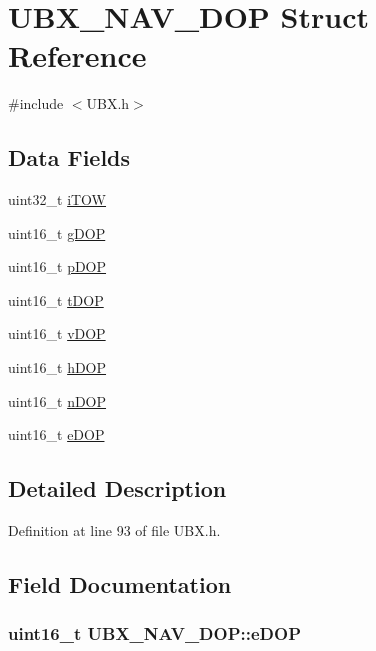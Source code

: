 \hypertarget{struct_u_b_x___n_a_v___d_o_p}{\section{\-U\-B\-X\-\_\-\-N\-A\-V\-\_\-\-D\-O\-P \-Struct \-Reference}
\label{struct_u_b_x___n_a_v___d_o_p}
}


{\ttfamily \#include $<$\-U\-B\-X.\-h$>$}

\subsection*{\-Data \-Fields}
\begin{DoxyCompactItemize}
\item 
uint32\-\_\-t \hyperlink{struct_u_b_x___n_a_v___d_o_p_ae5ea4b23ed8d603c7360a18053975010}{i\-T\-O\-W}
\item 
uint16\-\_\-t \hyperlink{struct_u_b_x___n_a_v___d_o_p_a2b2e6160322047b85f23f1cb527bc6fd}{g\-D\-O\-P}
\item 
uint16\-\_\-t \hyperlink{struct_u_b_x___n_a_v___d_o_p_a1ad5dc519aeceb3054f3a4a0ab8fc5ea}{p\-D\-O\-P}
\item 
uint16\-\_\-t \hyperlink{struct_u_b_x___n_a_v___d_o_p_a12bd31e6a5d13f568b90a13f3888c694}{t\-D\-O\-P}
\item 
uint16\-\_\-t \hyperlink{struct_u_b_x___n_a_v___d_o_p_afb69d800723e5600027869cb709dd800}{v\-D\-O\-P}
\item 
uint16\-\_\-t \hyperlink{struct_u_b_x___n_a_v___d_o_p_a04de37f3f6aaf991ce6435808faed53b}{h\-D\-O\-P}
\item 
uint16\-\_\-t \hyperlink{struct_u_b_x___n_a_v___d_o_p_ae3287c2656c08835bdd2ffa7e28d0ee4}{n\-D\-O\-P}
\item 
uint16\-\_\-t \hyperlink{struct_u_b_x___n_a_v___d_o_p_a901ab6a79b4129a6627012207415790d}{e\-D\-O\-P}
\end{DoxyCompactItemize}


\subsection{\-Detailed \-Description}


\-Definition at line 93 of file \-U\-B\-X.\-h.



\subsection{\-Field \-Documentation}
\hypertarget{struct_u_b_x___n_a_v___d_o_p_a901ab6a79b4129a6627012207415790d}{
\subsubsection[{e\-D\-O\-P}]{\setlength{\rightskip}{0pt plus 5cm}uint16\-\_\-t {\bf \-U\-B\-X\-\_\-\-N\-A\-V\-\_\-\-D\-O\-P\-::e\-D\-O\-P}}}\label{struct_u_b_x___n_a_v___d_o_p_a901ab6a79b4129a6627012207415790d}


